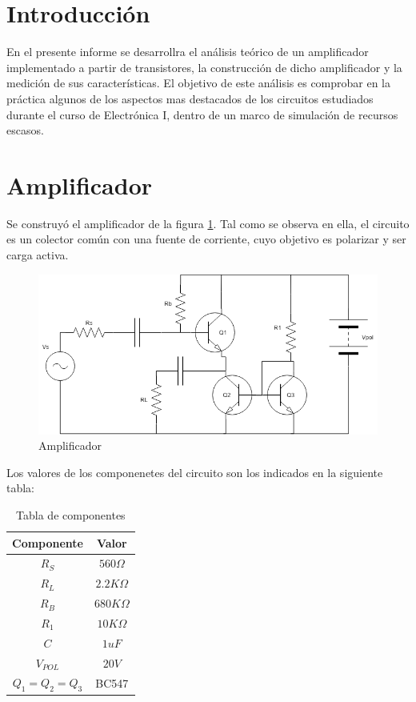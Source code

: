 \documentclass[../../main.tex]{subfiles}
\begin{document}
\section{Introducción}
En el presente informe se desarrollra el análisis te\'orico de un amplificador implementado a partir de transistores, la construcción de dicho amplificador y la medición de sus características. El objetivo de este an\'alisis es comprobar en la pr\'actica algunos de los aspectos mas destacados de los circuitos estudiados durante el curso de Electr\'onica I, dentro de un marco de simulación de recursos escasos.

\section{Amplificador}
Se construyó el amplificador de la figura \ref{fig:cir}. Tal como se observa en ella, el circuito es un colector común con una fuente de corriente, cuyo objetivo es polarizar y ser carga activa.

\begin{figure}[H]	
	\centering
	\includegraphics[scale=0.5]{imagenes/circuito.png}
	\caption{Amplificador}\label{fig:cir}
\end{figure}

Los valores de los componenetes del circuito son los indicados en la siguiente tabla:
\begin{table}[h]
\begin{center}
\begin{tabular}{|c|c|}
\hline
Componente& Valor\\
\hline \hline
$R_S$ & $560 \Omega$  \\ \hline
$R_L$ & $2.2 K \Omega$  \\ \hline
$R_B$ & $680 K \Omega$  \\ \hline
$R_1$ & $10K\Omega$  \\ \hline
$C$ & $1uF$  \\ \hline
$V_{POL}$ & $20V$  \\ \hline
$Q_1 = Q_2 = Q_3$ & BC547  \\ \hline

\end{tabular}
\caption{Tabla de componentes} \label{tab:comp}
\end{center}
\end{table}
\end{document}
